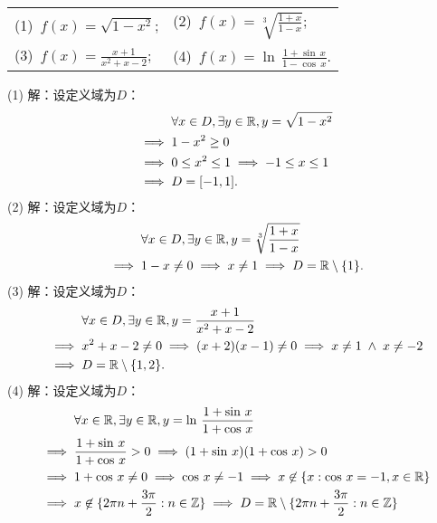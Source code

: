 \begin{table}[H]
    \centering
    \begin{tabularx}{\textwidth} {  >{\raggedright\arraybackslash}X >{\raggedright\arraybackslash}X  }
        (1)~$f(x)=\displaystyle\sqrt{1-x^2}$; & (2)~$f(x)=\displaystyle\sqrt[3]{\displaystyle\frac{1+x}{1-x}}$; \\ [1em]
        (3)~$f(x)=\displaystyle\frac{x+1}{x^2 + x -2}$; & (4)~$f(x) = \ln \, \displaystyle\frac{1+\sin \, x}{1-\cos \, x}$.
      \end{tabularx}
\end{table}
(1) 解：设定义域为$D$：
\begin{align}
    &\mathrel{\phantom{\implies}} \forall x \in D, \exists y \in \mathbb{R}, y = \displaystyle\sqrt{1-x^2} \\
    &\implies 1 - x^2 \geq 0 \\
    &\implies 0 \leq x^2 \leq 1 \implies -1 \leq x \leq 1 \\
    &\implies D = [-1, 1].
\end{align}
(2) 解：设定义域为$D$：
\begin{align}
    &\mathrel{\phantom{\implies}} \forall x \in D, \exists y \in \mathbb{R}, y = \displaystyle\sqrt[3]{\displaystyle\frac{1+x}{1-x}} \\
    &\implies 1 - x \neq 0 \implies x \neq 1 \implies D = \mathbb{R} \setminus \{ 1 \}.
\end{align}
(3) 解：设定义域为$D$：
\begin{align}
    &\mathrel{\phantom{\implies}} \forall x \in D, \exists y \in \mathbb{R}, y = \displaystyle\frac{x+1}{x^2 +x - 2} \\
    &\implies x^2 + x - 2 \neq 0 \implies (x+2)(x-1) \neq 0 \implies x \neq 1 \; \land \; x \neq -2 \\
    &\implies D = \mathbb{R} \setminus \{ 1, 2 \}.
\end{align}
(4) 解：设定义域为$D$：
\begin{align}
    &\mathrel{\phantom{\implies}} \forall x \in \mathbb{R}, \exists y \in \mathbb{R}, y = \ln \, \frac{1+\sin \, x}{1+ \cos \, x} \\
    &\implies \frac{1+\sin \, x}{1+\cos \, x} > 0 \implies (1+\sin \, x)(1+\cos \, x) > 0  \\
    &\implies 1 + \cos \, x \neq 0 \implies \cos \, x \neq -1 \implies x \not\in \{x : \cos \, x = -1, x \in \mathbb{R} \} \\
    &\implies x \not\in \{ 2\pi n + \frac{3\pi}{2} : n \in \mathbb{Z} \} \implies D = \mathbb{R} \setminus \{ 2 \pi n + \frac{3 \pi}{2} : n \in \mathbb{Z} \}
\end{align}

